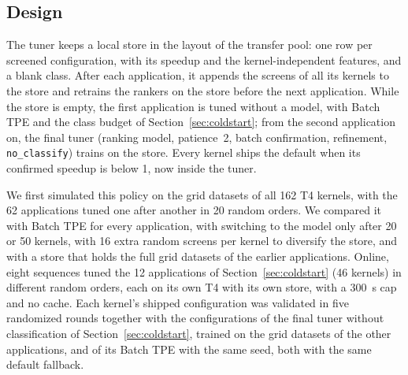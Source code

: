 \documentclass[10pt]{article}
\newcommand{\code}[1]{\texttt{#1}}
\begin{document}
\subsection{Design}
The tuner keeps a local store in the layout of the transfer pool: one row per
screened configuration, with its speedup and the kernel-independent features,
and a blank class. After each application, it appends the screens of all its
kernels to the store and retrains the rankers on the store before the next
application. While the store is empty, the first application is tuned without
a model, with Batch TPE and the class budget of Section~\ref{sec:coldstart};
from the second application on, the final tuner (ranking model, patience~2,
batch confirmation, refinement, \code{no\_classify}) trains on the store. Every
kernel ships the default when its confirmed speedup is below 1, now inside the
tuner.

We first simulated this policy on the grid datasets of all 162 T4 kernels, with
the 62 applications tuned one after another in 20 random orders. We compared it
with Batch TPE for every application, with switching to the model only after 20
or 50 kernels, with 16 extra random screens per kernel to diversify the store,
and with a store that holds the full grid datasets of the earlier applications.
Online, eight sequences tuned the 12 applications of
Section~\ref{sec:coldstart} (46 kernels) in different random orders, each on its
own T4 with its own store, with a 300~s cap and no cache. Each kernel's shipped
configuration was validated in five randomized rounds together with the
configurations of the final tuner without classification of
Section~\ref{sec:coldstart}, trained on the grid datasets of the other
applications, and of its Batch TPE with the same seed, both with the same
default fallback.
\end{document}
